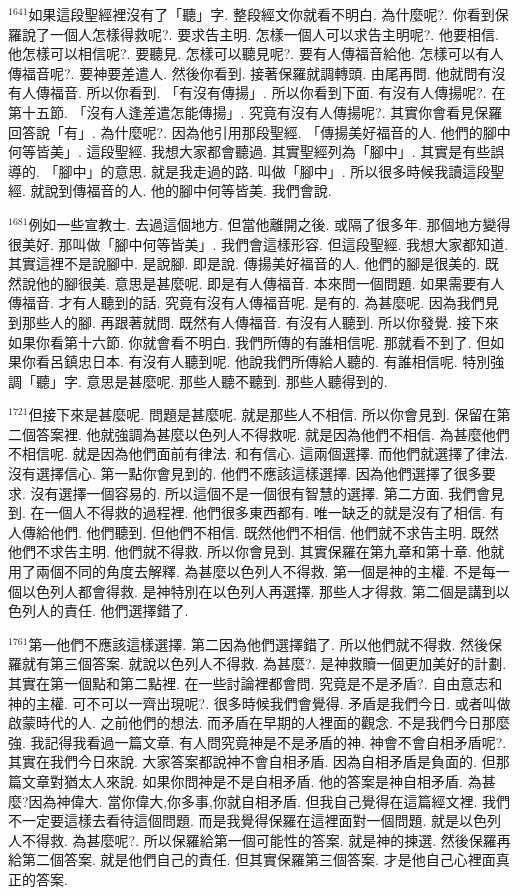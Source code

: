\documentclass{book}
\begin{document}
$^{1641}$如果這段聖經裡沒有了「聽」字.
整段經文你就看不明白.
為什麼呢?.
你看到保羅說了一個人怎樣得救呢?.
要求告主明.
怎樣一個人可以求告主明呢?.
他要相信.
他怎樣可以相信呢?.
要聽見.
怎樣可以聽見呢?.
要有人傳福音給他.
怎樣可以有人傳福音呢?.
要神要差遣人.
然後你看到.
接著保羅就調轉頭.
由尾再問.
他就問有沒有人傳福音.
所以你看到.
「有沒有傳揚」.
所以你看到下面.
有沒有人傳揚呢?.
在第十五節.
「沒有人逢差遣怎能傳揚」.
究竟有沒有人傳揚呢?.
其實你會看見保羅回答說「有」.
為什麼呢?.
因為他引用那段聖經.
「傳揚美好福音的人.
他們的腳中何等皆美」.
這段聖經.
我想大家都會聽過.
其實聖經列為「腳中」.
其實是有些誤導的.
「腳中」的意思.
就是我走過的路.
叫做「腳中」.
所以很多時候我讀這段聖經.
就說到傳福音的人.
他的腳中何等皆美.
我們會說.

$^{1681}$例如一些宣教士.
去過這個地方.
但當他離開之後.
或隔了很多年.
那個地方變得很美好.
那叫做「腳中何等皆美」.
我們會這樣形容.
但這段聖經.
我想大家都知道.
其實這裡不是說腳中.
是說腳.
即是說.
傳揚美好福音的人.
他們的腳是很美的.
既然說他的腳很美.
意思是甚麼呢.
即是有人傳福音.
本來問一個問題.
如果需要有人傳福音.
才有人聽到的話.
究竟有沒有人傳福音呢.
是有的.
為甚麼呢.
因為我們見到那些人的腳.
再跟著就問.
既然有人傳福音.
有沒有人聽到.
所以你發覺.
接下來如果你看第十六節.
你就會看不明白.
我們所傳的有誰相信呢.
那就看不到了.
但如果你看呂鎮忠日本.
有沒有人聽到呢.
他說我們所傳給人聽的.
有誰相信呢.
特別強調「聽」字.
意思是甚麼呢.
那些人聽不聽到.
那些人聽得到的.

$^{1721}$但接下來是甚麼呢.
問題是甚麼呢.
就是那些人不相信.
所以你會見到.
保留在第二個答案裡.
他就強調為甚麼以色列人不得救呢.
就是因為他們不相信.
為甚麼他們不相信呢.
就是因為他們面前有律法.
和有信心.
這兩個選擇.
而他們就選擇了律法.
沒有選擇信心.
第一點你會見到的.
他們不應該這樣選擇.
因為他們選擇了很多要求.
沒有選擇一個容易的.
所以這個不是一個很有智慧的選擇.
第二方面.
我們會見到.
在一個人不得救的過程裡.
他們很多東西都有.
唯一缺乏的就是沒有了相信.
有人傳給他們.
他們聽到.
但他們不相信.
既然他們不相信.
他們就不求告主明.
既然他們不求告主明.
他們就不得救.
所以你會見到.
其實保羅在第九章和第十章.
他就用了兩個不同的角度去解釋.
為甚麼以色列人不得救.
第一個是神的主權.
不是每一個以色列人都會得救.
是神特別在以色列人再選擇.
那些人才得救.
第二個是講到以色列人的責任.
他們選擇錯了.

$^{1761}$第一他們不應該這樣選擇.
第二因為他們選擇錯了.
所以他們就不得救.
然後保羅就有第三個答案.
就說以色列人不得救.
為甚麼?.
是神救贖一個更加美好的計劃.
其實在第一個點和第二點裡.
在一些討論裡都會問.
究竟是不是矛盾?.
自由意志和神的主權.
可不可以一齊出現呢?.
很多時候我們會覺得.
矛盾是我們今日.
或者叫做啟蒙時代的人.
之前他們的想法.
而矛盾在早期的人裡面的觀念.
不是我們今日那麼強.
我記得我看過一篇文章.
有人問究竟神是不是矛盾的神.
神會不會自相矛盾呢?.
其實在我們今日來說.
大家答案都說神不會自相矛盾.
因為自相矛盾是負面的.
但那篇文章對猶太人來說.
如果你問神是不是自相矛盾.
他的答案是神自相矛盾.
為甚麼?因為神偉大.
當你偉大,你多事,你就自相矛盾.
但我自己覺得在這篇經文裡.
我們不一定要這樣去看待這個問題.
而是我覺得保羅在這裡面對一個問題.
就是以色列人不得救.
為甚麼呢?.
所以保羅給第一個可能性的答案.
就是神的揀選.
然後保羅再給第二個答案.
就是他們自己的責任.
但其實保羅第三個答案.
才是他自己心裡面真正的答案.
\end{document}
